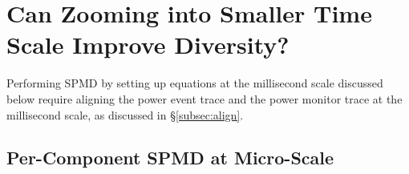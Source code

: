 \section{Can Zooming into Smaller Time Scale Improve Diversity?}
\label{sec:micronano}


Performing SPMD by setting up equations at the millisecond scale discussed below
require aligning the power event trace and the power monitor trace at the millisecond scale,
as discussed in \S\ref{subsec:align}.

\subsection{Per-Component SPMD at Micro-Scale}
\label{sec:modelling_micro}


